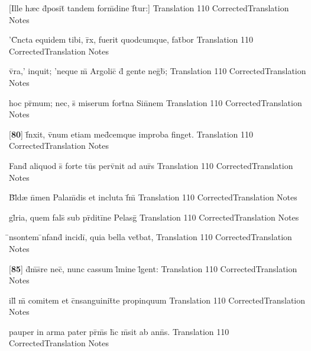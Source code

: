 \latline
  {[Ille h{\ae}c d\={}posit\={} tandem form\={\macron {\i}}dine f\={}tur:] }
  { Translation }
  {110}
  { CorrectedTranslation }
  { Notes }


\latline
  {'C\={}ncta equidem tibi, r\={}x, fuerit quodcumque, fat\={}bor}
  { Translation }
  {110}
  { CorrectedTranslation }
  { Notes }


\latline
  {v\={}ra,' inquit; 'neque m\={} Argolic\={} d\={} gente neg\={}b\={};}
  { Translation }
  {110}
  { CorrectedTranslation }
  { Notes }


\latline
  {hoc pr\={\macron {\i}}mum; nec, s\={\macron {\i}} miserum fort\={}na Sin\={}nem}
  { Translation }
  {110}
  { CorrectedTranslation }
  { Notes }


\latline
  {[\textbf{80}] f\={\macron {\i}}nxit, v\={}num etiam med\={}cemque improba finget.}
  { Translation }
  {110}
  { CorrectedTranslation }
  { Notes }


\latline
  {Fand\={} aliquod s\={\macron {\i}} forte tu\={}s perv\={}nit ad aur\={\macron {\i}}s}
  { Translation }
  {110}
  { CorrectedTranslation }
  { Notes }


\latline
  {B\={}l\={\macron {\i}}d{\ae} n\={}men Palam\={}dis et incluta f\={}m\={}}
  { Translation }
  {110}
  { CorrectedTranslation }
  { Notes }


\latline
  {gl\={}ria, quem fals\={} sub pr\={}diti\={}ne Pelasg\={\macron {\i}}}
  { Translation }
  {110}
  { CorrectedTranslation }
  { Notes }


\latline
  {\={\macron {\i}}nsontem \={\macron {\i}}nfand\={} incidi\={}, quia bella vet\={}bat,}
  { Translation }
  {110}
  { CorrectedTranslation }
  { Notes }


\latline
  {[\textbf{85}] d\={}m\={\macron {\i}}s\={}re nec\={\macron {\i}}, nunc cassum l\={}mine l\={}gent:}
  { Translation }
  {110}
  { CorrectedTranslation }
  { Notes }


\latline
  {ill\={\macron {\i}} m\={} comitem et c\={}nsanguinit\={}te propinquum}
  { Translation }
  {110}
  { CorrectedTranslation }
  { Notes }


\latline
  {pauper in arma pater pr\={\macron {\i}}m\={\macron {\i}}s h\={}c m\={\macron {\i}}sit ab ann\={\macron {\i}}s.}
  { Translation }
  {110}
  { CorrectedTranslation }
  { Notes }


